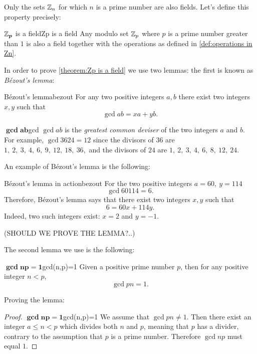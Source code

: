 Only the sets $\mathbb{Z}_{n}$ for which $n$ is a prime number are also fields. Let's define this property precisely:

\begin{theorem}{$\bm{\mathbb{Z}_{p}}$ is a field}{Zp is a field}
	Any modulo set $\mathbb{Z}_{p}$ where $p$ is a prime number greater than $1$ is also a field together with the operations as defined in \autoref{def:operations in Zn}.
\end{theorem}

In order to prove \autoref{theorem:Zp is a field} we use two lemmas: the first is known as \emph{B\'ezout’s lemma}:
\begin{lemma}{B\'ezout's lemma}{bezout}
	For any two positive integers $a,b$ there exist two integers $x,y$ such that
	\[
		\gcd{a}{b} = xa+yb.
	\]
\end{lemma}

\begin{note}{$\bm{\gcd{a}{b}}$}{gcd}
	$\gcd{a}{b}$ is the \emph{greatest common deviser} of the two integers $a$ and $b$. For example, $\gcd{36}{24}=12$ since the divisors of $36$ are $1,\ 2,\ 3,\ 4,\ 6,\ 9,\ 12,\ 18,\ 36$,\ and the divisors of $24$ are $1,\ 2,\ 3,\ 4,\ 6,\ 8,\ 12,\ 24$.
\end{note}

An example of B\'ezout's lemma is the following:

\begin{example}{B\'ezout's lemma in action}{bezout}
	For the two positive integers $a=60,\ y=114$
	\[
		\gcd{60}{114}=6.
	\]
	Therefore, B\'ezout's lemma says that there exist two integers $x,y$ such that
	\[
		6 = 60x + 114y.
	\]
	Indeed, two such integers exist: $x=2$ and $y=-1$.
\end{example}
(SHOULD WE PROVE THE LEMMA?..)

The second lemma we use is the following:
\begin{lemma}{$\bm{\gcd{n}{p}=1}$}{gcd(n,p)=1}
	Given a positive prime number $p$, then for any positive integer $n<p$,
	\[
		\gcd{p}{n}=1.
	\]
\end{lemma}

Proving the lemma:
\begin{proof}{$\bm{\gcd{n}{p}=1}$}{gcd(n,p)=1}
	We assume that $\gcd{p}{n} \neq 1$. Then there exist an integer $a\leq n<p$ which divides both $n$ and $p$, meaning that $p$ has a divider, contrary to the assumption that $p$ is a prime number. Therefore $\gcd{n}{p}$ must equal $1$.
\end{proof}

